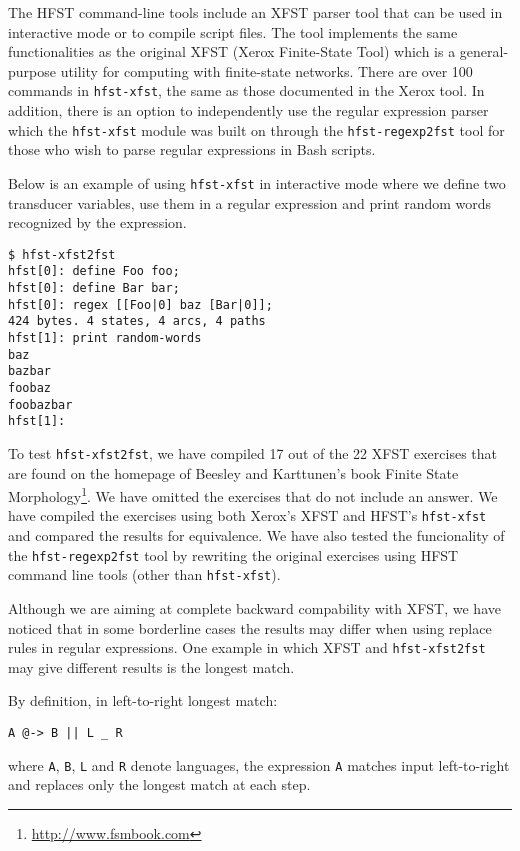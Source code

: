 \documentclass{llncs}
\begin{document}
The HFST command-line tools include an XFST parser tool that can be used
in interactive mode or to compile script files. The tool implements the
same functionalities as the original XFST (Xerox Finite-State Tool)
which is a general-purpose utility for computing with finite-state
networks. There are over 100 commands in \texttt{hfst-xfst}, the same as those documented in the
Xerox tool. In addition, there is an option to independently use
the regular expression parser which the \texttt{hfst-xfst} module was built on through the
\verb+hfst-regexp2fst+ tool for those who wish to parse
regular expressions in Bash scripts.

Below is an example of using \texttt{hfst-xfst} in interactive
mode where we define two transducer variables, use them in a regular
expression and print random words recognized by the expression.

\begin{verbatim}
$ hfst-xfst2fst 
hfst[0]: define Foo foo;
hfst[0]: define Bar bar;
hfst[0]: regex [[Foo|0] baz [Bar|0]];
424 bytes. 4 states, 4 arcs, 4 paths
hfst[1]: print random-words
baz
bazbar
foobaz
foobazbar
hfst[1]: 
\end{verbatim}

To test \verb+hfst-xfst2fst+, we have compiled 17 out of the 22 XFST exercises
that are found on the homepage of Beesley and Karttunen's book Finite
State Morphology\footnote{\url{http://www.fsmbook.com}}. We have omitted the exercises that do not include an
answer. We have compiled the exercises
using both Xerox's XFST and HFST's \texttt{hfst-xfst} and compared the results
for equivalence. We have also tested the funcionality of the
\verb+hfst-regexp2fst+ tool by rewriting the original exercises
using HFST command line tools (other than \texttt{hfst-xfst}).

Although we are aiming at complete backward compability with XFST, we
have noticed that in some borderline cases the results may differ 
when using replace rules in regular expressions.
One example in which XFST and \verb+hfst-xfst2fst+ may
give different results is the longest match.

By definition, in left-to-right longest match: 
\begin{verbatim}
A @-> B || L _ R
\end{verbatim}
where \verb+A+, \verb+B+, \verb+L+ and \verb+R+ denote languages, the
expression \verb+A+ matches input left-to-right and replaces only the longest
match at each step.
\end{document}
